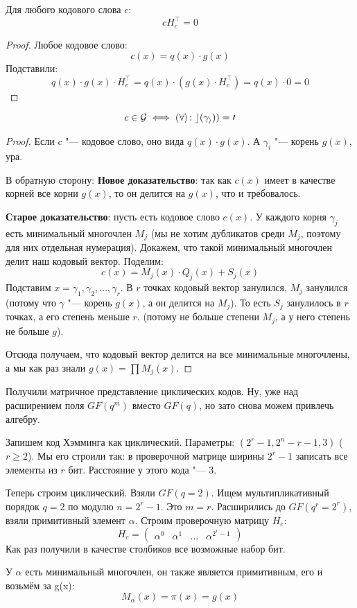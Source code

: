 \begin{lemma}
	Для любого кодового слова $c$:
	\[
	c H_c^\top = 0
	\]
\end{lemma}
\begin{proof}
	Любое кодовое слово:
	\[
	c(x) = q(x) \cdot g(x)
	\]
	Подставили:
	\[
	q(x) \cdot g(x) \cdot H_c^\top = q(x) \cdot (g(x) \cdot H_c^\top) = q(x) \cdot 0 = 0
	\]
\end{proof}
\begin{lemma}
	\[ c \in \cal G \iff (\forall i \colon c(\gamma_i)) = 0 \]
\end{lemma}
\begin{proof}
	Если $c$ "--- кодовое слово, оно вида $q(x) \cdot g(x)$.
	А $\gamma_i$ "--- корень $g(x)$, ура.

	В обратную сторону:
	\textbf{Новое доказательство}:
	так как $c(x)$ имеет в качестве корней все корни $g(x)$, то он делится на $g(x)$,
	что и требовалось.

	\textbf{Старое доказательство}:
	пусть есть кодовое слово $c(x)$.
	У каждого корня $\gamma_j$ есть минимальный многочлен $M_j$ (мы не хотим дубликатов среди $M_j$,
	поэтому для них отдельная нумерация).
	Докажем, что такой минимальный многочлен делит наш кодовый вектор.
	Поделим:
	\[
	c(x) = M_j(x) \cdot Q_j(x) + S_j(x)
	\]
	Подставим $x=\gamma_1, \gamma_2, \dots, \gamma_r$.
	В $r$ точках кодовый вектор занулился,
	$M_j$ занулился (потому что $\gamma$ "--- корень $g(x)$, а он делится на $M_j$).
	То есть $S_j$ занулилось в $r$ точках, а его степень меньше $r$.
	(потому не больше степени $M_j$, а у него степень не больше $g$).

	Отсюда получаем, что кодовый вектор делится на все минимальные многочлены,
	а мы как раз знали $g(x)=\prod M_j(x)$.
\end{proof}

\begin{Rem}
	Получили матричное представление циклических кодов.
	Ну, уже над расширением поля $GF(q^m)$ вместо $GF(q)$,
	но зато снова можем привлечь алгебру.
\end{Rem}

\begin{Rem}
	Запишем код Хэмминга как циклический.
	Параметры: $(2^r-1,2^n-r-1,3)$ ($r \ge 2$).
	Мы его строили так: в проверочной матрице
	ширины $2^r-1$ записать все элементы из $r$ бит.
	Расстояние у этого кода "--- 3.

	Теперь строим циклический.
	Взяли $GF(q=2)$.
	Ищем мультипликативный порядок $q=2$ по модулю $n=2^r-1$.
	Это $m=r$.
	Расширились до $GF(q^r=2^r)$, взяли примитивный элемент $\alpha$.
	Строим проверочную матрицу $H_c$:
	\[
	H_c = \begin{pmatrix}
	\alpha^0 & \alpha^1 & \dots & \alpha^{2^r-1}
	\end{pmatrix}
	\]
	Как раз получили в качестве столбиков все возможные набор бит.

	У $\alpha$ есть минимальный многочлен, он также является примитивным,
	его и возьмём за g(x):
	\[
		M_\alpha(x) = \pi(x) = g(x)
	\]
\end{Rem}

